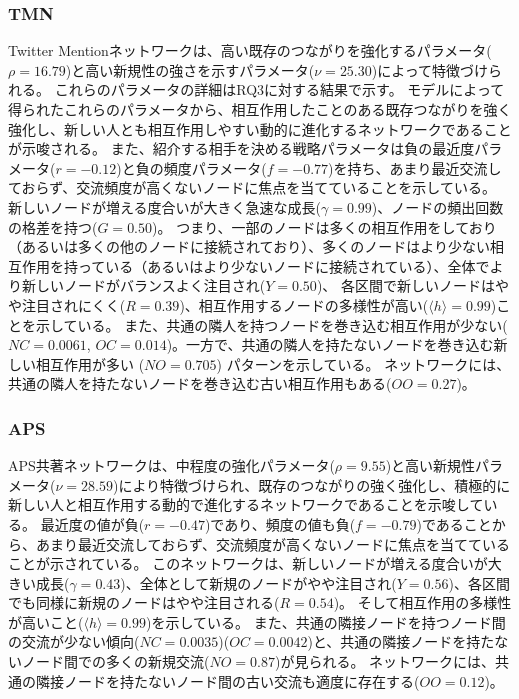 \documentclass[uplatex,11pt,openany]{ujreport}
\begin{document}
            \subsubsection*{TMN}
            Twitter Mentionネットワークは、高い既存のつながりを強化するパラメータ($\rho = 16.79$)と高い新規性の強さを示すパラメータ($\nu = 25.30$)によって特徴づけられる。
            これらのパラメータの詳細はRQ3に対する結果で示す。
            モデルによって得られたこれらのパラメータから、相互作用したことのある既存つながりを強く強化し、新しい人とも相互作用しやすい動的に進化するネットワークであることが示唆される。
            また、紹介する相手を決める戦略パラメータは負の最近度パラメータ($r = -0.12$)と負の頻度パラメータ($f = -0.77$)を持ち、あまり最近交流しておらず、交流頻度が高くないノードに焦点を当てていることを示している。
            新しいノードが増える度合いが大きく急速な成長($\gamma = 0.99$)、ノードの頻出回数の格差を持つ($G = 0.50$)。
            つまり、一部のノードは多くの相互作用をしており（あるいは多くの他のノードに接続されており）、多くのノードはより少ない相互作用を持っている（あるいはより少ないノードに接続されている）、全体でより新しいノードがバランスよく注目され($Y = 0.50$)、
            各区間で新しいノードはやや注目されにくく($R = 0.39$)、相互作用するノードの多様性が高い($\langle h \rangle = 0.99$)ことを示している。
            また、共通の隣人を持つノードを巻き込む相互作用が少ない($NC = 0.0061$, $OC = 0.014$)。一方で、共通の隣人を持たないノードを巻き込む新しい相互作用が多い ($NO = 0.705$) パターンを示している。
            ネットワークには、共通の隣人を持たないノードを巻き込む古い相互作用もある($OO = 0.27$)。

            \subsubsection*{APS}
            APS共著ネットワークは、中程度の強化パラメータ($\rho = 9.55$)と高い新規性パラメータ($\nu = 28.59$)により特徴づけられ、既存のつながりの強く強化し、積極的に新しい人と相互作用する動的で進化するネットワークであることを示唆している。
            最近度の値が負($r = -0.47$)であり、頻度の値も負($f = -0.79$)であることから、あまり最近交流しておらず、交流頻度が高くないノードに焦点を当てていることが示されている。
            このネットワークは、新しいノードが増える度合いが大きい成長($\gamma = 0.43$)、全体として新規のノードがやや注目され($Y = 0.56$)、各区間でも同様に新規のノードはやや注目される($R = 0.54$)。
            そして相互作用の多様性が高いこと($\langle h \rangle = 0.99$)を示している。
            また、共通の隣接ノードを持つノード間の交流が少ない傾向($NC=0.0035$)($OC=0.0042$)と、共通の隣接ノードを持たないノード間での多くの新規交流($NO = 0.87$)が見られる。
            ネットワークには、共通の隣接ノードを持たないノード間の古い交流も適度に存在する($OO = 0.12$)。
\end{document}
